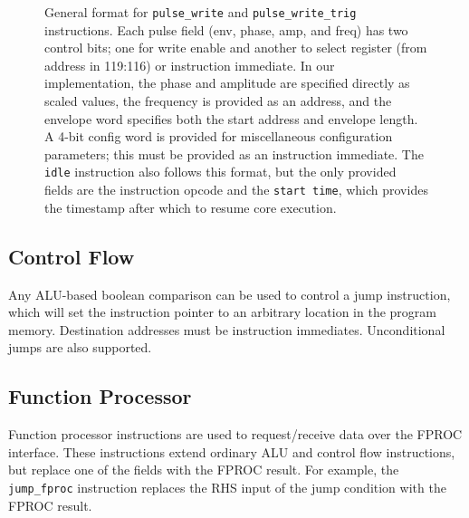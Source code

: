 \documentclass[journal]{IEEEtran}
\begin{document}
\begin{figure}
\centering
{}
\caption{General format for \texttt{pulse\_write} and \texttt{pulse\_write\_trig} instructions. Each pulse field (env, phase, amp, and freq) has two control bits; one for write enable and another to select register (from address in 119:116) or instruction immediate. In our implementation, the phase and amplitude are specified directly as scaled values, the frequency is provided as an address, and the envelope word specifies both the start address and envelope length. A 4-bit config word is provided for miscellaneous configuration parameters; this must be provided as an instruction immediate. The \texttt{idle} instruction also follows this format, but the only provided fields are the instruction opcode and the \texttt{start time}, which provides the timestamp after which to resume core execution.}
\label{fig:pulse_instr}
\end{figure}


\subsection{Control Flow}

Any ALU-based boolean comparison can be used to control a jump instruction, which will set the instruction pointer to an arbitrary location in the program memory. Destination addresses must be instruction immediates. Unconditional jumps are also supported.

\subsection{Function Processor}

Function processor instructions are used to request/receive data over the FPROC interface. These instructions extend ordinary ALU and control flow instructions, but replace one of the fields with the FPROC result. For example, the \verb|jump_fproc| instruction replaces the RHS input of the jump condition with the FPROC result.
\end{document}
